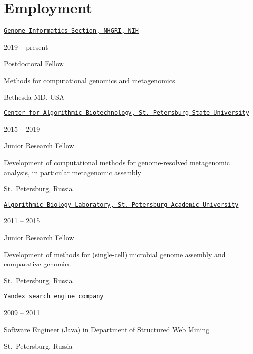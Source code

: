 
\section{Employment}
\href{https://genomeinformatics.github.io/}{\tt Genome Informatics Section, NHGRI, NIH}
\begin{innerlist}
  \item 2019 -- present
  \item Postdoctoral Fellow 
  \item Methods for computational genomics and metagenomics
  \item Bethesda MD, USA
\end{innerlist}

\blankline

\href{http://cab.spbu.ru/}{\tt Center for Algorithmic Biotechnology, St.~Petersburg State University}
\begin{innerlist}
  \item 2015 -- 2019
  \item Junior Research Fellow
  \item Development of computational methods for genome-resolved metagenomic analysis, in particular metagenomic assembly
  \item St.~Petersburg, Russia
\end{innerlist}

\blankline

\href{http://bioinf.spbau.ru}{\tt Algorithmic Biology Laboratory, St.~Petersburg Academic University}
\begin{innerlist}
  \item 2011 -- 2015
  \item Junior Research Fellow
  \item Development of methods for (single-cell) microbial genome assembly and comparative genomics
  \item St.~Petersburg, Russia
\end{innerlist}

\blankline

\href{http://company.yandex.com/}{\tt Yandex search engine company}%
\begin{innerlist}
  \item 2009 -- 2011
  \item Software Engineer (Java) in Department of Structured Web Mining
  \item St.~Petersburg, Russia
\end{innerlist}

